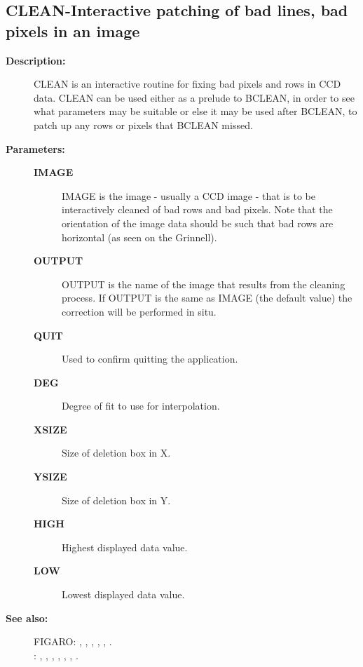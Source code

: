 \subsection{CLEAN-\label{CLEAN}Interactive patching of bad lines, bad pixels in an image}
\begin{description}

\item [\textbf{Description:}]
 CLEAN is an interactive routine for fixing bad pixels and
 rows in CCD data.  CLEAN can be used either as a prelude
 to BCLEAN, in order to see what parameters may be suitable
 or else it may be used after BCLEAN, to patch up any rows
 or pixels that BCLEAN missed.

\item [\textbf{Parameters:}]
\begin{description}
\item [\textbf{IMAGE}]
 IMAGE is the image - usually a CCD image - that is to be
 interactively cleaned of bad rows and bad pixels.  Note that the
 orientation of the image data should be such that bad rows are
 horizontal (as seen on the Grinnell).
\item [\textbf{OUTPUT}]
 OUTPUT is the name of the image that results from the cleaning
 process.  If OUTPUT is the same as IMAGE (the default value) the
 correction will be performed in situ.
\item [\textbf{QUIT}]
 Used to confirm quitting the application.
\item [\textbf{DEG}]
 Degree of fit to use for interpolation.
\item [\textbf{XSIZE}]
 Size of deletion box in X.
\item [\textbf{YSIZE}]
 Size of deletion box in Y.
\item [\textbf{HIGH}]
 Highest displayed data value.
\item [\textbf{LOW}]
 Lowest displayed data value.
\end{description}

\item [\textbf{See also:}]
FIGARO: , , , , , .\\
: , , , , , , .\\


\end{description}
